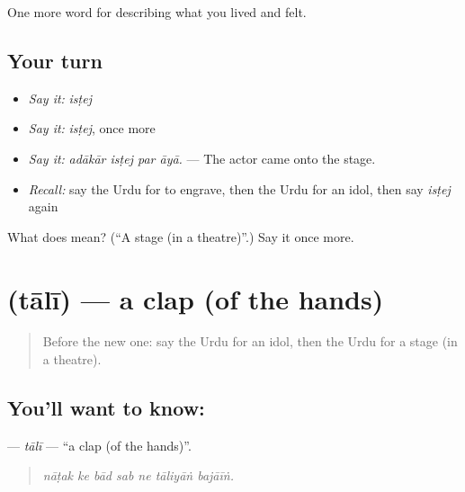 \begin{grammarlens}[title={What you've built}]
One more word for describing what you lived and felt.
\end{grammarlens}

\subsection*{Your turn}
\begin{itemize}
\raggedright
  \item \emph{Say it:} \emph{isṭej}
  \item \emph{Say it:} \emph{isṭej}, once more
  \item \emph{Say it:} \emph{adākār isṭej par āyā.} — The actor came onto the stage.
  \item \emph{Recall:} say the Urdu for to engrave, then the Urdu for an idol, then say \emph{isṭej} again
\end{itemize}

\begin{tcolorbox}[breakable,colback=teal!4,colframe=teal!35!black,title={Before you move on}]
What does  mean? (\textquotedblleft{}A stage (in a theatre)\textquotedblright{}.) Say it once more.
\end{tcolorbox}
\section[\texorpdfstring{\ur{تالی} (tālī)}{تالی (tālī)}]{ (tālī) — a clap (of the hands)}

\label{lesson:UR-C517-tali}



\begin{quote}
Before the new one: say the Urdu for an idol, then the Urdu for a stage (in a theatre).
\end{quote}

\subsection*{You'll want to know: }
\textbf{} — \emph{tālī} — \textquotedblleft{}a clap (of the hands)\textquotedblright{}.

\begin{quote}
      
\end{quote}

\begin{quote}
\emph{nāṭak ke bād sab ne tāliyāṅ bajāīṅ.}
\end{quote}

